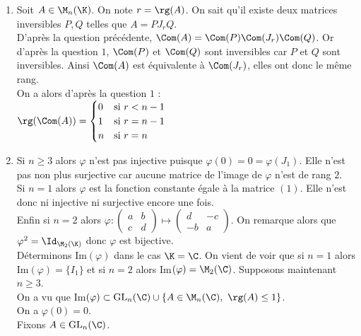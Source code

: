 \documentclass[8pt]{book}
\begin{document}
\begin{enumerate}[leftmargin=*]
		Par conséquent, par composition et produit de limites, $\Com(A_kB_k)\ukfty\longrightarrow\Com(AB)$ et $\Com(A_k)\Com(B_k)\ukfty\longrightarrow\Com(A)\Com(B)$.\\
		D'autre part, $\forall k\in \N,\ \Com(A_kB_k)=\Com(A_k)\Com(B_k)$. Ainsi par unicité de la limite, $\Com(AB)=\Com(A)\Com(B)$.
		\item Soit $A\in \M_n(\K)$. On note $r=\rg(A)$. On sait qu'il existe deux matrices inversibles $P,Q$ telles que $A=PJ_rQ$.\\
		D'après la question précédente, $\Com(A)=\Com(P)\Com(J_r)\Com(Q)$. Or d'après la question $1$, $\Com(P)$ et $\Com(Q)$ sont inversibles car $P$ et $Q$ sont inversibles. Ainsi $\Com(A)$ est équivalente à $\Com(J_r)$, elles ont donc le même rang.\\
		On a alors d'après la question $1$ :\\
		$\rg(\Com(A))=
		\begin{cases}
			0&\mbox{si }r<n-1\\
			1&\mbox{si }r=n-1\\
			n&\mbox{si }r=n
		\end{cases}$
		\item Si $n\geq 3$ alors $\varphi$ n'est pas injective puisque $\varphi(0)=0=\varphi(J_1)$. Elle n'est pas non plus surjective car aucune matrice de l'image de $\varphi$ n'est de rang $2$.\\
		Si $n=1$ alors $\varphi$ est la fonction constante égale à la matrice $(1)$. Elle n'est donc ni injective ni surjective encore une fois.\\
		Enfin si $n=2$ alors $\varphi:\begin{pmatrix}a&b\\c&d\end{pmatrix}\mapsto\begin{pmatrix}d&-c\\-b&a\end{pmatrix}$. On remarque alors que $\varphi^2=\Id_{\M_2(\K)}$ donc $\varphi$ est bijective.\\
		Déterminons Im$(\varphi)$ dans le cas $\K=\C$. On vient de voir que si $n=1$ alors Im$(\varphi)=\{I_1\}$ et si $n=2$ alors Im$(\varphi)=\M_2(\C)$. Supposons maintenant $n\geq 3$.\\
		On a vu que Im$(\varphi)\subset\text{GL}_n(\C)\cup\{A\in \M_n(\C),\ \rg(A)\leq 1\}$.\\
		On a $\varphi(0)=0$.\\
		Fixons $A\in \text{GL}_n(\C)$.\\

\end{enumerate}
\end{document}
